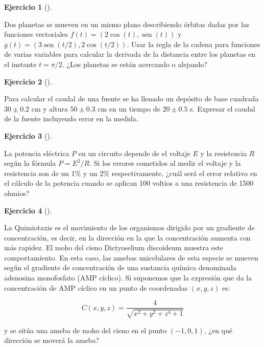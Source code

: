 \documentclass[
  a4paper,
]{scrreport}
\theoremstyle{definition}
\newtheorem{exercise}{Ejercicio}[chapter]
\theoremstyle{remark}
\begin{document}
\begin{exercise}[]\protect\hypertarget{exr-distancia-planetas}{}\label{exr-distancia-planetas}

Dos planetas se mueven en un mismo plano describiendo órbitas dadas por
las funciones vectoriales \(f(t) = (2 \cos(t), \operatorname{sen}(t))\)
y \(g(t) = (3\operatorname{sen}(t/2), 2\cos(t/2))\). Usar la regla de la
cadena para funciones de varias variables para calcular la derivada de
la distancia entre los planetas en el instante \(t=\pi/2\). ¿Los
planetas se están acercando o alejando?

\end{exercise}

\begin{exercise}[]\protect\hypertarget{exr-transmision-errores-caudal-fuente}{}\label{exr-transmision-errores-caudal-fuente}

Para calcular el caudal de una fuente se ha llenado un depósito de base
cuadrada \(30\pm 0.2\) cm y altura \(50\pm 0.3\) cm en un tiempo de
\(20\pm 0.5\) s. Expresar el caudal de la fuente incluyendo error en la
medida.

\end{exercise}

\begin{exercise}[]\protect\hypertarget{exr-transmision-errores-potencial-electrico}{}\label{exr-transmision-errores-potencial-electrico}

La potencia eléctrica \(P\) en un circuito depende de el voltaje \(E\) y
la resistencia \(R\) según la fórmula \(P = E^2/R\). Si los errores
cometidos al medir el voltaje y la resistencia son de un 1\% y un 2\%
respectivamente, ¿cuál será el error relativo en el cálculo de la
potencia cuando se aplican 100 voltios a una resistencia de 1500 ohmios?

\end{exercise}

\begin{exercise}[]\protect\hypertarget{exr-ameba}{}\label{exr-ameba}

La Quimiotaxis es el movimiento de los organismos dirigido por un
gradiente de concentración, es decir, en la dirección en la que la
concentración aumenta con más rapidez. El moho del cieno Dictyoselium
discoideum muestra este comportamiento. En esta caso, las amebas
unicelulares de esta especie se mueven según el gradiente de
concentración de una sustancia química denominada adenosina monofosfato
(AMP cíclico). Si suponemos que la expresión que da la concentración de
AMP cíclico en un punto de coordenadas \((x,y,z)\) es:

\[
C(x,y,z) = \frac{4} {{\sqrt {x^2  + y^2  + z^4  + 1} }}
\]

y se sitúa una ameba de moho del cieno en el punto \((-1,0,1)\), ¿en qué
dirección se moverá la ameba?

\end{exercise}
\end{document}
